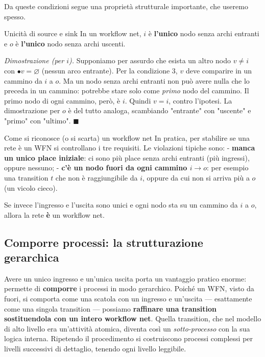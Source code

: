Da queste condizioni segue una proprietà strutturale importante, che useremo spesso.

\begin{boxtheorem}{Unicità di source e sink}
In un workflow net, $i$ è \textbf{l'unico} nodo senza archi entranti e $o$ è \textbf{l'unico} nodo senza archi uscenti.

\emph{Dimostrazione (per $i$).} Supponiamo per assurdo che esista un altro nodo $v \neq i$ con $\bullet v = \varnothing$ (nessun arco entrante). Per la condizione 3, $v$ deve comparire in un cammino da $i$ a $o$. Ma un nodo senza archi entranti non può avere nulla che lo preceda in un cammino: potrebbe stare solo come \emph{primo} nodo del cammino. Il primo nodo di ogni cammino, però, è $i$. Quindi $v = i$, contro l'ipotesi. La dimostrazione per $o$ è del tutto analoga, scambiando "entrante" con "uscente" e "primo" con "ultimo". $\blacksquare$
\end{boxtheorem}

\begin{boxtip}{Come si riconosce (o si scarta) un workflow net}
In pratica, per stabilire se una rete è un WFN si controllano i tre requisiti. Le violazioni tipiche sono: - \textbf{manca un unico place iniziale}: ci sono più place senza archi entranti (più ingressi), oppure nessuno; - \textbf{c'è un nodo fuori da ogni cammino $i \to o$}: per esempio una transition $t$ che non è raggiungibile da $i$, oppure da cui non si arriva più a $o$ (un vicolo cieco).

Se invece l'ingresso e l'uscita sono unici e ogni nodo sta su un cammino da $i$ a $o$, allora la rete \textbf{è} un workflow net.
\end{boxtip}

\subsection{\texorpdfstring{Comporre processi: la strutturazione gerarchica}{Comporre processi: la strutturazione gerarchica}}

Avere un unico ingresso e un'unica uscita porta un vantaggio pratico enorme: permette di \textbf{comporre} i processi in modo gerarchico. Poiché un WFN, visto da fuori, si comporta come una scatola con un ingresso e un'uscita — esattamente come una singola transition — possiamo \textbf{raffinare una transition sostituendola con un intero workflow net}. Quella transition, che nel modello di alto livello era un'attività atomica, diventa così un \emph{sotto-processo} con la sua logica interna. Ripetendo il procedimento si costruiscono processi complessi per livelli successivi di dettaglio, tenendo ogni livello leggibile.

